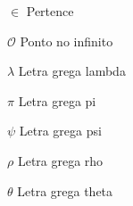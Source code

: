 \begin{simbolos}
  \item[$ \in $] Pertence
  \item[$ \mathcal{O} $] Ponto no infinito
  \item[$ \lambda $] Letra grega lambda
  \item[$ \pi $] Letra grega pi
  \item[$ \psi $] Letra grega psi
  \item[$ \rho $] Letra grega rho
  \item[$ \theta $] Letra grega theta
\end{simbolos}
